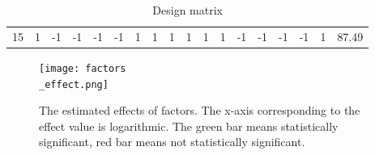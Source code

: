 \documentclass{article}
\begin{document}
\begin{table}[!ht]
{\begin{tabular}{|r|r|r|r|r|r|r|r|r|r|r|r|r|r|r|r|r|r|}
            15        & 1                  & -1         & -1         & -1         & -1         & 1           & 1           & 1           & 1           & 1           & 1           & -1           & -1           & -1           & -1           & 1             & 87.49      \\
        \end{tabular}
    }
    \caption{Design matrix}
    \label{tab:design_matrix}
\end{table}

\begin{figure}[!ht]
    \centering
    \texttt{[image: factors\\\_effect.png]}
    \caption{The estimated effects of factors. The x-axis corresponding to the effect value is logarithmic. The green bar means statistically significant, red bar means not statistically significant.}
    \label{fig:factors_effect}
\end{figure}
\end{document}

